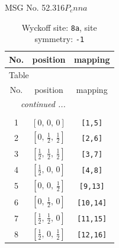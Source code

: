 \documentclass[fleqn,8pt]{jsarticle}
\begin{document}
\setcounter{MaxMatrixCols}{32}

\renewcommand{\tablename}{Table~}
\renewcommand{\figurename}{Figure~}
\begin{center}
\LARGE
MSG No. 52.316\quad$P_{c}nna$
\end{center}
\renewcommand{\arraystretch}{1.2}
\begin{longtable}{ccc}
\caption{Wyckoff site: {\tt 8a}, site symmetry: {\tt -1}}
 \\
 \hline \hline
No. & position & mapping \\ \hline \endfirsthead

\multicolumn{2}{l}{\tablename\ \thetable{}} \\
 \hline \hline
No. & position & mapping \\ \hline \endhead

 \hline \hline
\multicolumn{2}{r}{\footnotesize\it continued ...} \\ \endfoot

 \hline \hline
\multicolumn{2}{r}{} \\ \endlastfoot

1 & $\left[ 0,\, 0,\, 0 \right]$ & {\tt [1,5]} \\ \hline
2 & $\left[ 0,\, \frac{1}{2},\, \frac{1}{2} \right]$ & {\tt [2,6]} \\ \hline
3 & $\left[ \frac{1}{2},\, \frac{1}{2},\, \frac{1}{2} \right]$ & {\tt [3,7]} \\ \hline
4 & $\left[ \frac{1}{2},\, 0,\, 0 \right]$ & {\tt [4,8]} \\ \hline
5 & $\left[ 0,\, 0,\, \frac{1}{2} \right]$ & {\tt [9,13]} \\ \hline
6 & $\left[ 0,\, \frac{1}{2},\, 0 \right]$ & {\tt [10,14]} \\ \hline
7 & $\left[ \frac{1}{2},\, \frac{1}{2},\, 0 \right]$ & {\tt [11,15]} \\ \hline
8 & $\left[ \frac{1}{2},\, 0,\, \frac{1}{2} \right]$ & {\tt [12,16]} \\
\end{longtable}
\renewcommand{\arraystretch}{1.2}
\end{document}
